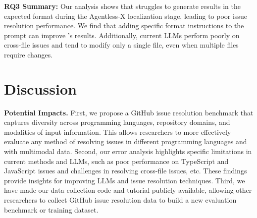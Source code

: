 \begin{center}
    \begin{myboxc} \textbf{RQ3 Summary: } Our analysis shows that \Claude struggles to generate results in the expected format during the Agentless-X localization stage, leading to poor issue resolution performance. We find that adding specific format instructions to the prompt can improve \Claude's results. Additionally, current LLMs perform poorly on cross-file issues and tend to modify only a single file, even when multiple files require changes.
    \end{myboxc} %
\end{center}



\secmargin
\section{Discussion}
\hspace{1em}\textbf{Potential Impacts.} First, we propose a GitHub issue resolution benchmark that captures diversity across programming languages, repository domains, and modalities of input information. This allows researchers to more effectively evaluate any method of resolving issues in different programming languages and with multimodal data. Second, our error analysis highlights specific limitations in current methods and LLMs, such as poor performance on TypeScript and JavaScript issues and challenges in resolving cross-file issues, etc. These findings provide insights for improving LLMs and issue resolution techniques. Third, we have made our data collection code and tutorial publicly available, allowing other researchers to collect GitHub issue resolution data to build a new evaluation benchmark or training dataset.  

